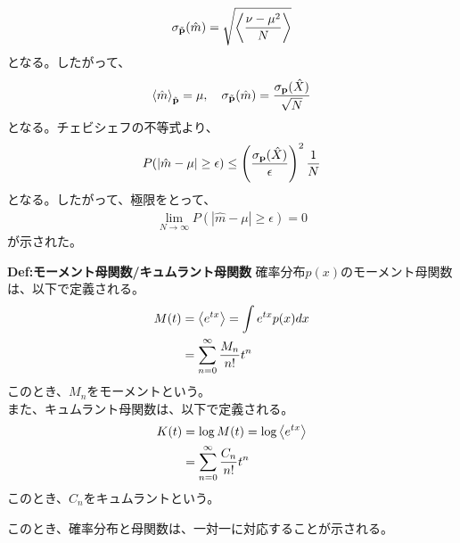 \documentclass[a4paper,11pt]{jsarticle}
\numberwithin{equation}{section}
\begin{document}
\begin{align}
  \sigma_{\tilde{\vb{p}}}(\hat{m}) = \sqrt{\expval{\frac{\nu - \mu^2}{N}}}
\end{align}
となる。したがって、
\begin{align}
  \ev{\hat{m}}_{\tilde{\vb{p}}} = \mu, \quad \sigma_{\tilde{\vb{p}}}(\hat{m}) = \frac{\sigma_{\vb{p}}(\hat{X})}{\sqrt{N}}
\end{align}
となる。チェビシェフの不等式より、
\begin{align}
  P(|\hat{m} - \mu| \geq \epsilon) \leq \left(\frac{\sigma_{\vb{p}}(\hat{X})}{\epsilon}\right)^2 \frac{1}{N}
\end{align}
となる。したがって、極限をとって、
\begin{align}
  \lim_{N \to \infty} P(|\hat{m} - \mu| \geq \epsilon) = 0
\end{align}
が示された。\hfill\qedsymbol\\

\begin{itembox}[l]{\textbf{Def:モーメント母関数/キュムラント母関数}}
  確率分布$p(x)$のモーメント母関数は、以下で定義される。
  \begin{align}
    M(t) &= \expval{e^{tx}} = \int e^{tx} p(x) dx \label{eq:moment}\\
    &= \sum_{n=0}^{\infty} \frac{M_n}{n!} t^n
  \end{align}
  このとき、$M_n$をモーメントという。\\
  また、キュムラント母関数は、以下で定義される。
  \begin{align}
    K(t) &= \log M(t) = \log \expval{e^{tx}} \label{eq:cumulant}\\
    &= \sum_{n=0}^{\infty} \frac{C_n}{n!} t^n
  \end{align}
  このとき、$C_n$をキュムラントという。
\end{itembox}
このとき、確率分布と母関数は、一対一に対応することが示される。\\
\end{document}
